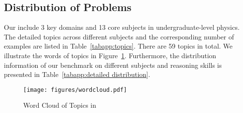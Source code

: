 \subsection{Distribution of Problems}\label{app: distribution}

Our {\benchmark} include 3 key domains and 13 core subjects in undergraduate-level physics. 
The detailed topics across different subjects and the corresponding number of examples are listed in Table~\ref{tabapp:topics}.
There are 59 topics in total.
We illustrate the words of topics in Figure~\ref{fig:word_cloud}.
Furthermore, the distribution information of our benchmark on different subjects and reasoning skills is presented in Table~\ref{tabapp:detailed distribution}.




\begin{figure}[b]
    \centering
    \texttt{[image: figures/wordcloud.pdf]}
    \caption{Word Cloud of Topics in {\benchmark}}
    \label{fig:word_cloud}
\end{figure}



